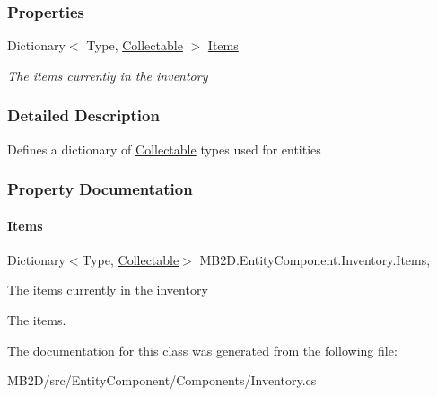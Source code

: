 \subsubsection*{Properties}
\begin{DoxyCompactItemize}
\item 
Dictionary$<$ Type, \hyperlink{class_m_b2_d_1_1_collectable}{Collectable} $>$ \hyperlink{class_m_b2_d_1_1_entity_component_1_1_inventory_a92e46a1ff1ec2caf6f01d7fca18e7232}{Items}
\begin{DoxyCompactList}\small\item\em The items currently in the inventory \end{DoxyCompactList}\end{DoxyCompactItemize}


\subsubsection{Detailed Description}
Defines a dictionary of \hyperlink{class_m_b2_d_1_1_collectable}{Collectable} types used for entities 



\subsubsection{Property Documentation}
\hypertarget{class_m_b2_d_1_1_entity_component_1_1_inventory_a92e46a1ff1ec2caf6f01d7fca18e7232}{}\label{class_m_b2_d_1_1_entity_component_1_1_inventory_a92e46a1ff1ec2caf6f01d7fca18e7232} 
\paragraph{\texorpdfstring{Items}{Items}}
{\footnotesize\ttfamily Dictionary$<$Type, \hyperlink{class_m_b2_d_1_1_collectable}{Collectable}$>$ M\+B2\+D.\+Entity\+Component.\+Inventory.\+Items\hspace{0.3cm}{\ttfamily [get]}, {\ttfamily [set]}}



The items currently in the inventory 

The items.

The documentation for this class was generated from the following file\+:\begin{DoxyCompactItemize}
\item 
M\+B2\+D/src/\+Entity\+Component/\+Components/Inventory.\+cs\end{DoxyCompactItemize}

